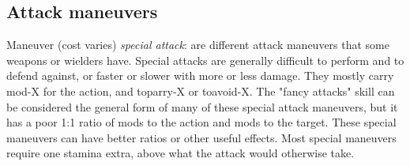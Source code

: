 %
%
%
%
%
%
%
%
%


\closeskillslist




\subsection*{Attack maneuvers}

Maneuver (cost varies) \emph{special attack}: are different attack maneuvers that some weapons or wielders have. Special attacks are generally difficult to perform and to defend against, or faster or slower with more or less damage. They mostly carry mod-X for the action, and toparry-X or toavoid-X. The "fancy attacks" skill can be considered the general form of many of these special attack maneuvers, but it has a poor 1:1 ratio of mods to the action and mods to the target. These special maneuvers can have better ratios or other useful effects. Most special maneuvers require one stamina extra, above what the attack would otherwise take.

